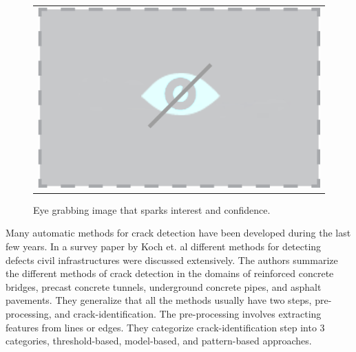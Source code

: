  
    \begin{figure} [ht]
    
        \begin{centering}
        
            \begin{tabular}{c}
                \includegraphics[width=\columnwidth]{Images/NoVisualHolder.png}
            \end{tabular}
            
            \caption{Eye grabbing image that sparks interest and confidence.}
            \label{fig:FigTease}
            
        \end{centering}
        
    \end{figure}
 
 
 
    Many automatic methods for crack detection have been developed during the last few years. In a survey paper by Koch et. al \cite{Koch:2015} different methods for detecting defects civil infrastructures  were discussed extensively. The authors summarize the different methods of crack detection in the domains of reinforced concrete bridges, precast concrete tunnels, underground concrete pipes, and asphalt pavements. They generalize that all the methods usually have two steps, pre-processing, and crack-identification. The pre-processing involves extracting features from lines or edges. They categorize crack-identification step into 3 categories, threshold-based, model-based, and pattern-based approaches. 

